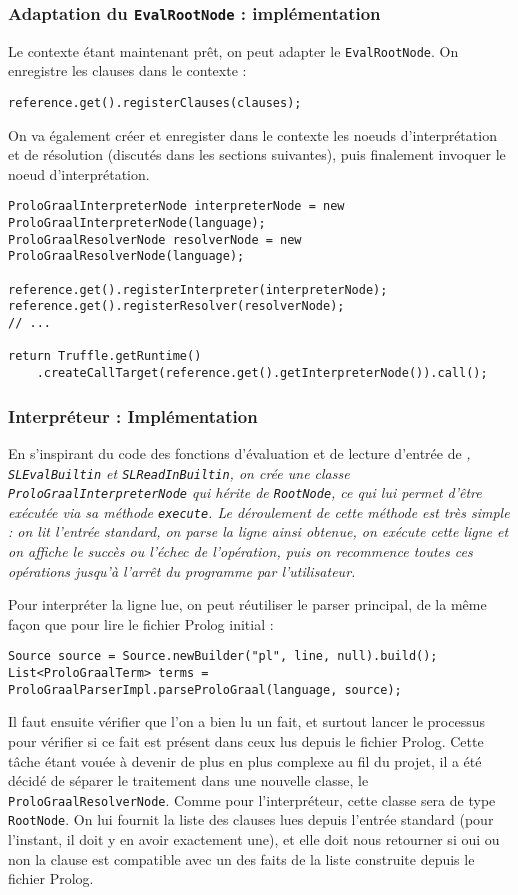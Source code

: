\documentclass[../report.tex]{subfiles}
\begin{document}
\subsubsection{Adaptation du \texttt{EvalRootNode} : implémentation}
Le contexte étant maintenant prêt, on peut adapter le \texttt{EvalRootNode}. On enregistre les clauses dans le contexte :
\begin{verbatim}
reference.get().registerClauses(clauses);
\end{verbatim}
On va également créer et enregister dans le contexte les noeuds d'interprétation et de résolution (discutés dans les sections suivantes), puis finalement invoquer le noeud d'interprétation.
\begin{verbatim}
ProloGraalInterpreterNode interpreterNode = new ProloGraalInterpreterNode(language);
ProloGraalResolverNode resolverNode = new ProloGraalResolverNode(language);

reference.get().registerInterpreter(interpreterNode);
reference.get().registerResolver(resolverNode);
// ...

return Truffle.getRuntime()
    .createCallTarget(reference.get().getInterpreterNode()).call();
\end{verbatim}

\subsubsection{Interpréteur : Implémentation}
En s'inspirant du code des fonctions d'évaluation et de lecture d'entrée de \sl{}, \texttt{SLEvalBuiltin} et \texttt{SLReadInBuiltin}, on crée une classe \texttt{ProloGraalInterpreterNode} qui hérite de \texttt{RootNode}, ce qui lui permet d'être exécutée via sa méthode \texttt{execute}. Le déroulement de cette méthode est très simple : on lit l'entrée standard, on parse la ligne ainsi obtenue, on exécute cette ligne et on affiche le succès ou l'échec de l'opération, puis on recommence toutes ces opérations jusqu'à l'arrêt du programme par l'utilisateur.

Pour interpréter la ligne lue, on peut réutiliser le parser principal, de la même façon que pour lire le fichier Prolog initial :
\begin{verbatim}
Source source = Source.newBuilder("pl", line, null).build();
List<ProloGraalTerm> terms = ProloGraalParserImpl.parseProloGraal(language, source);
\end{verbatim}
Il faut ensuite vérifier que l'on a bien lu un fait, et surtout lancer le processus pour vérifier si ce fait est présent dans ceux lus depuis le fichier Prolog. Cette tâche étant vouée à devenir de plus en plus complexe au fil du projet, il a été décidé de séparer le traitement dans une nouvelle classe, le \texttt{ProloGraalResolverNode}. Comme pour l'interpréteur, cette classe sera de type \texttt{RootNode}. On lui fournit la liste des clauses lues depuis l'entrée standard (pour l'instant, il doit y en avoir exactement une), et elle doit nous retourner si oui ou non la clause est compatible avec un des faits de la liste construite depuis le fichier Prolog.
\end{document}
